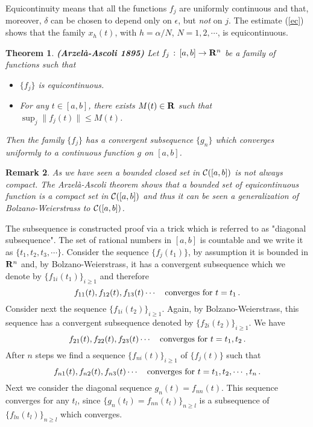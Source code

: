 \documentclass[12pt]{report}
\newcommand{\calC}{{\cal C}}
\newcommand{\bR}{{\bf R}}
\newtheorem{theorem}{Theorem}[section]
\newtheorem{remark}[theorem]{Remark}
\newcommand{\proof}{\noindent {\em Proof:~}}
\def\eqref#1{(\ref{#1})}
\def\to{\rightarrow}
\begin{document}
Equicontinuity means that all the functions $f_j$ are uniformly
continuous and that, moreover, $\delta$ can be chosen to depend only on
$\epsilon$, but {\em not} on $j$.  The estimate \eqref{ec} shows that
the family $x_h(t)$, with $h=\alpha/N$, $N=1,2, \cdots$,  
is equicontinuous.

\begin{theorem}{\bf (Arzel\`a-Ascoli 1895)}  \label{aras}
Let $f_j \,:\, [a,b] \to \bR^n$ be a family of functions such that 
\begin{itemize}
\item $\{f_j\}$ is equicontinuous.
\item For any $t \in [a,b]$, there exists $M(t)\in \bR$ such that
  $\sup_{j} \|f_j(t) \| \le M(t)$.
\end{itemize}
 Then the family $\{f_j\}$ has a convergent subsequence $\{g_n\}$
 which converges uniformly to a continuous function $g$ on $[a,b]$.
 \end{theorem}
 
\begin{remark}{\rm  As we have seen a bounded closed set in $\calC([a,b])$ 
is not always compact. The Arzel\`a-Ascoli theorem shows that a
bounded set of equicontinuous function is a compact set in
$\calC([a,b])$ and thus it can be seen a generalization of
Bolzano-Weierstrass to $\calC([a,b])$.  }
\end{remark}

\proof The subsequence is constructed proof via a trick which is
referred to as "diagonal subsequence".  The set of rational numbers in
$[a,b]$ is countable and we write it as $\{t_1, t_2, t_3, \cdots
\}$. Consider the sequence $\{f_j(t_1)\}$, by assumption it is bounded
in $\bR^n$ and, by Bolzano-Weierstrass, it has a convergent
subsequence which we denote by $\{ f_{1i}(t_1)\}_{i \ge 1}$ and
therefore
\begin{equation}
f_{11}(t), f_{12}(t), f_{13}(t) \cdots  \quad {\rm converges~for~} t=t_1\,.
\end{equation}
Consider next the sequence $\{ f_{1i}(t_2)\}_{i \ge 1}$. Again, by
Bolzano-Weierstrass, this sequence has a convergent subsequence denoted
by $\{ f_{2i}(t_2)\}_{i \ge 1}$.  We have
\begin{equation}
f_{21}(t), f_{22}(t), f_{23}(t) \cdots  \quad {\rm converges~for~} 
t=t_1, t_2 \,.
\end{equation}
After $n$ steps we find a sequence $\{ f_{ni}(t)\}_{i \ge 1}$ of
$\{f_j(t)\}$ such that
\begin{equation}
f_{n1}(t), f_{n2}(t), f_{n3}(t) \cdots  \quad {\rm converges~for~} 
t=t_1, t_2, \cdots, t_n \,.
\end{equation}
Next we consider the diagonal sequence $g_n(t)= f_{nn}(t)$.  This
sequence converges for any $t_l$, since $\{g_{n}(t_l)= f_{nn}(t_l)\}_{n
  \ge l}$ is a subsequence of $\{f_{ln}(t_l)\}_{n \ge l}$ which
converges.
\end{document}
